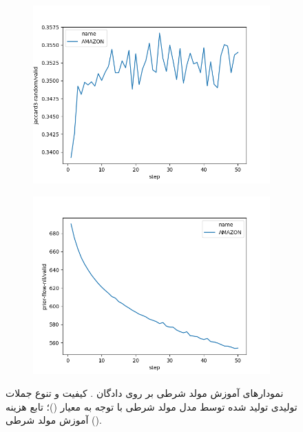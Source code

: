\newpage
\begin{figure}[h]
	\centering
	\begin{subfigure}{0.3\textheight}
		\centering
		\includegraphics[width=1.\textwidth]{images/figs/2020_01_03__19_13_00__jaccard3-random.png}
		\caption{}
		\label{fig:chap4:amazon_flow_jaccard}
	\end{subfigure}
	\begin{subfigure}{0.3\textheight}
		\centering
		\includegraphics[width=1.\textwidth]{images/figs/2020_01_03__19_13_00__prior-flow-nll.png}
		\caption{}
		\label{fig:chap4:amazon_flow_nll}
	\end{subfigure}
	\caption{
		نمودار‌های آموزش مولد شرطی بر روی دادگان \amazon{}.
		کیفیت و تنوع جملات تولیدی تولید شده توسط مدل مولد شرطی با توجه به معیار \jaccard{}
		()؛
        		تابع هزینه آموزش مولد شرطی
        ().
	}
	\label{fig:chap4:amazon_flow}
\end{figure}

